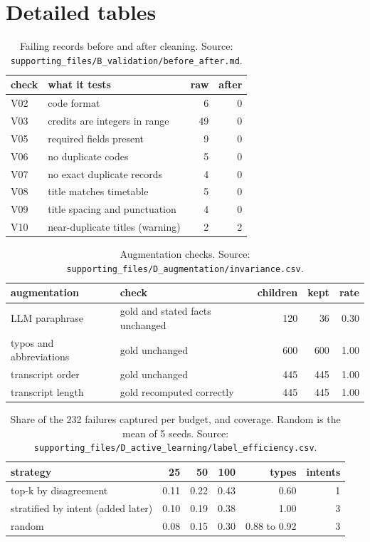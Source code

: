 \documentclass[11pt,a4paper]{article}
\newcommand{\f}[1]{\nolinkurl{#1}}
\newcounter{ev}
\begin{document}
\section{Detailed tables}\label{app:d}
\begin{table}[!h]
\centering\small
\caption{Failing records before and after cleaning. Source: \f{supporting_files/B_validation/before_after.md}.}\label{tab:ba}
\begin{tabular}{@{}llrr@{}}
\toprule
check & what it tests & raw & after \\
\midrule
V02 & code format & 6 & 0 \\
V03 & credits are integers in range & 49 & 0 \\
V05 & required fields present & 9 & 0 \\
V06 & no duplicate codes & 5 & 0 \\
V07 & no exact duplicate records & 4 & 0 \\
V08 & title matches timetable & 5 & 0 \\
V09 & title spacing and punctuation & 4 & 0 \\
V10 & near-duplicate titles (warning) & 2 & 2 \\
\bottomrule
\end{tabular}
\end{table}

\begin{table}[!h]
\centering\small
\caption{Augmentation checks. Source: \f{supporting_files/D_augmentation/invariance.csv}.}\label{tab:aug}
\begin{tabular}{@{}llrrr@{}}
\toprule
augmentation & check & children & kept & rate \\
\midrule
LLM paraphrase & gold and stated facts unchanged & 120 & 36 & 0.30 \\
typos and abbreviations & gold unchanged & 600 & 600 & 1.00 \\
transcript order & gold unchanged & 445 & 445 & 1.00 \\
transcript length & gold recomputed correctly & 445 & 445 & 1.00 \\
\bottomrule
\end{tabular}
\end{table}

\begin{table}[!h]
\centering\small
\caption{Share of the 232 failures captured per budget, and coverage. Random is the mean of 5 seeds. Source:
\f{supporting_files/D_active_learning/label_efficiency.csv}.}\label{tab:al}
\begin{tabular}{@{}lrrrrr@{}}
\toprule
strategy & 25 & 50 & 100 & types & intents \\
\midrule
top-k by disagreement & 0.11 & 0.22 & 0.43 & 0.60 & 1 \\
stratified by intent (added later) & 0.10 & 0.19 & 0.38 & 1.00 & 3 \\
random & 0.08 & 0.15 & 0.30 & 0.88 to 0.92 & 3 \\
\bottomrule
\end{tabular}
\end{table}
\end{document}
